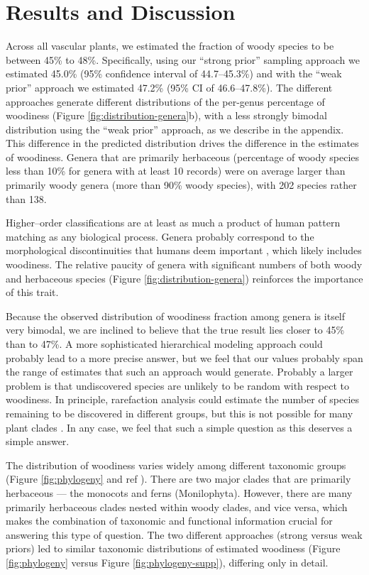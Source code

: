 \documentclass[12pt]{article}
\begin{document}
\section{Results and Discussion}

Across all vascular plants, we estimated the fraction of woody species
to be between 45\% to 48\%.
Specifically, using our ``strong prior'' sampling approach we
estimated 45.0\% (95\% confidence interval of 44.7--45.3\%) and with
the ``weak prior'' approach we estimated 47.2\% (95\% CI of
46.6--47.8\%).
% 
The different approaches generate different distributions of the
per-genus percentage of woodiness (Figure
\ref{fig:distribution-genera}b), with a less strongly bimodal
distribution using the ``weak prior'' approach, as we describe in the
appendix.
%
This difference in the predicted distribution drives the difference in
the estimates of woodiness.  Genera that are primarily herbaceous
(percentage of woody species less than 10\% for genera with at least
10 records) were on average larger than primarily woody genera (more
than 90\% woody species), with 202 species rather than 138.

Higher--order classifications are at least as much a product of human
pattern matching as any biological process.  Genera probably
correspond to the morphological discontinuities that humans deem
important \citep{scotland2004significance}, which likely includes
woodiness.  The relative paucity of genera with significant numbers of
both woody and herbaceous species (Figure
\ref{fig:distribution-genera}) reinforces the importance of this
trait.

Because the observed distribution of woodiness fraction among genera
is itself very bimodal, we are inclined to believe that the true
result lies closer to 45\% than to 47\%.  A more sophisticated
hierarchical modeling approach could probably lead to a more precise
answer, but we feel that our values probably span the range of
estimates that such an approach would generate.
%
Probably a larger problem is that undiscovered species are unlikely to
be random with respect to woodiness.  In principle, rarefaction
analysis could estimate the number of species remaining to be
discovered in different groups, but this is not possible for many
plant clades \citep{costello2011}.
%
In any case, we feel that such a simple question as this deserves a
simple answer.

The distribution of woodiness varies widely among different taxonomic
groups (Figure \ref{fig:phylogeny} and ref
\citep{sinnott1915evolution}).  There are two major clades that are
primarily herbaceous --- the monocots and ferns
(Monilophyta). However, there are many primarily herbaceous clades
nested within woody clades, and vice versa, which makes the
combination of taxonomic and functional information crucial for
answering this type of question.  The two different approaches (strong
versus weak priors) led to similar taxonomic distributions of
estimated woodiness (Figure \ref{fig:phylogeny} versus Figure
\ref{fig:phylogeny-supp}), differing only in detail.
\end{document}
